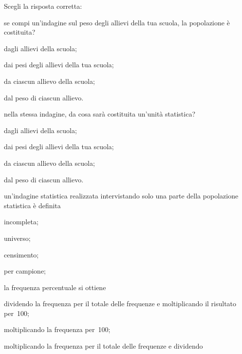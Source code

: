 \begin{esercizio}
\label{ese:A.39}
Scegli la risposta corretta:
\begin{enumerate*}
 \item se compi un'indagine sul peso degli allievi della tua scuola, la 
popolazione è costituita?
\begin{multicols}{2} \begin{enumeratea} 
 \item dagli allievi della scuola;
\item dai pesi degli allievi della tua scuola;
\item da ciascun allievo della scuola;
\item dal peso di ciascun allievo.
 \end{enumeratea} \end{multicols}
 \item nella stessa indagine, da cosa sarà costituita un'unità statistica?
\begin{multicols}{2} \begin{enumeratea}
 \item dagli allievi della scuola;
\item dai pesi degli allievi della tua scuola;
\item da ciascun allievo della scuola;
\item dal peso di ciascun allievo.
 \end{enumeratea} \end{multicols}
\item un'indagine statistica realizzata intervistando solo una parte della 
popolazione statistica è definita
\begin{multicols}{4} \begin{enumeratea}
 \item incompleta;
\item universo;
\item censimento;
\item per campione;
 \end{enumeratea} \end{multicols}
\item la frequenza percentuale si ottiene
 \begin{enumeratea}
\item dividendo la frequenza per il totale delle frequenze e moltiplicando 
il risultato per~100;
\item moltiplicando la frequenza per~100;
\item moltiplicando la frequenza per il totale delle frequenze e dividendo 

\end{enumeratea}
\end{enumerate*}
\end{esercizio}
